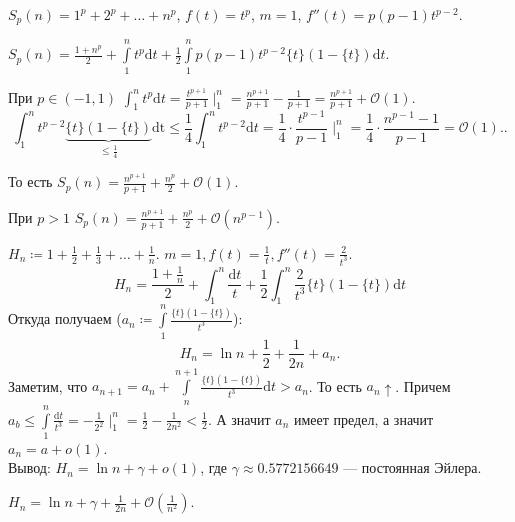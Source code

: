\begin{example}
    $S_p(n) = 1^p + 2^p + \ldots + n^p$, $f(t) = t^p$,  $m = 1$,  $f''(t) = p(p-1)t^{p-2}$.

    $S_p(n) = \frac{1+n^p}{2} + \int\limits_1^n t^p \mathrm{d}t + \frac{1}{2} \int\limits_1^n p(p-1)t^{p-2} \{t\}(1-\{t\}) \mathrm{d}t$.

    При $p \in (-1, 1)$  $\int_1^n t^p \mathrm{d}t = \frac{t^{p+1}}{p+1} \mid_1^n = \frac{n^{p+1}}{p+1} - \frac{1}{p+1} = \frac{n^{p+1}}{p+1} + \mathcal{O}(1)$.\[
        \int_1^n t^{p-2} \underbrace{\{t\}(1-\{t\})}_{\le \frac{1}{4}} \mathrm{dt} \le \frac{1}{4} \int_1^n t^{p-2} \mathrm{d}t = \frac{1}{4} \cdot \frac{t^{p-1}}{p-1} \mid_1^n = \frac{1}{4} \cdot \frac{n^{p-1} - 1}{p - 1} = \mathcal{O}(1).
    .\] 

    То есть $S_p(n) = \frac{n^{p+1}}{p+1} + \frac{n^p}{2} + \mathcal{O}(1)$.

    При $p > 1$  $S_p(n) = \frac{n^{p+1}}{p+1} + \frac{n^p}{2} + \mathcal{O}(n^{p-1})$.
\end{example}
\begin{example}
    $H_n \coloneqq 1 + \frac{1}{2} + \frac{1}{3} + \ldots + \frac{1}{n}$. $m = 1, f(t) = \frac{1}{t}, f''(t) = \frac{2}{t^3}$.
    \[
    H_n = \frac{1 + \frac{1}{n}}{2} + \int_1^n \frac{\mathrm{d}t}{t} + \frac{1}{2} \int_1^n \frac{2}{t^3}\{t\}(1-\{t\})\mathrm{d}t
    \] Откуда получаем ($a_n \coloneqq \int\limits_1^n \frac{\{t\}(1-\{t\})}{t^3} $): \[
H_n = \ln n + \frac{1}{2} + \frac{1}{2n} + a_n
.\] Заметим, что $a_{n+1} = a_n + \int\limits_n^{n+1}\frac{\{t\}(1-\{t\})}{t^3} \mathrm{d}t > a_n$. То есть $a_n\uparrow$. Причем $a_b \le \int\limits_1^n \frac{\mathrm{d}t}{t^3} = -\frac{1}{2^2} \mid_1^n = \frac{1}{2} - \frac{1}{2n^2} < \frac{1}{2}$. А значит $a_n$ имеет предел, а значит  $a_n = a + o(1)$. 
\\
Вывод:  $H_n = \ln n + \gamma + o(1)$, где  $\gamma \approx 0.5772156649$ --- постоянная Эйлера.
\end{example}
\begin{remark}
    $H_n = \ln n + \gamma + \frac{1}{2n} + \mathcal{O}(\frac{1}{n^2})$.
\end{remark}
